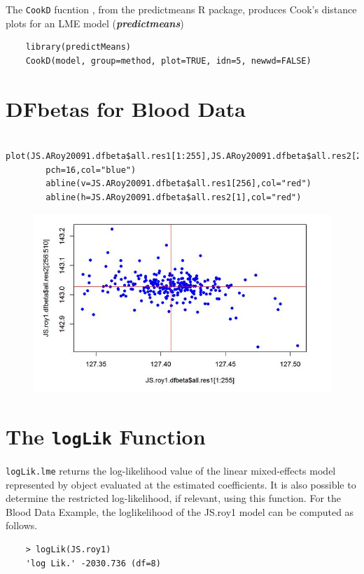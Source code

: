 \documentclass[12pt, a4paper]{report}
\theoremstyle{plain}
\theoremstyle{definition}
\theoremstyle{remark}
\begin{document}



The \texttt{CookD} fucntion , from the predictmeans R package, produces Cook’s distance plots for an LME model 
(\textbf{\textit{predictmeans}})



\begin{framed}
	\begin{verbatim}
	library(predictMeans)
	CookD(model, group=method, plot=TRUE, idn=5, newwd=FALSE)
	\end{verbatim}
\end{framed}


	\section{DFbetas for Blood Data}
	\begin{framed}
		\begin{verbatim}
		plot(JS.ARoy20091.dfbeta$all.res1[1:255],JS.ARoy20091.dfbeta$all.res2[256:510],
		pch=16,col="blue")
		abline(v=JS.ARoy20091.dfbeta$all.res1[256],col="red")
		abline(h=JS.ARoy20091.dfbeta$all.res2[1],col="red")
		\end{verbatim}
	\end{framed}
	\begin{figure}
		\centering
		\includegraphics[width=0.7\linewidth]{images/dfbetas-JS-Roy}
		\caption{}
		\label{fig:dfbetas-JS-ARoy2009}
	\end{figure}
	


\section{The \texttt{logLik} Function}
\texttt{logLik.lme} returns the log-likelihood value of the linear mixed-effects model represented by object evaluated at the estimated coefficients. It is also possible to determine the restricted log-likelihood, if relevant, using this function. For the Blood Data Example,  the loglikelihood of the JS.roy1 model can be computed as follows.
\begin{framed}
	\begin{verbatim}
	> logLik(JS.roy1)
	'log Lik.' -2030.736 (df=8)
	\end{verbatim}
\end{framed}
\end{document}
